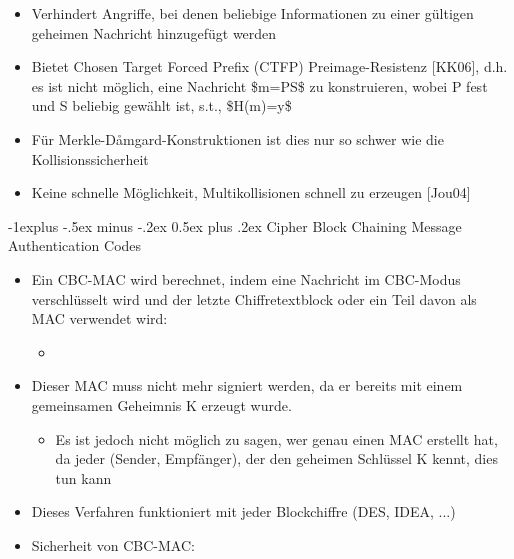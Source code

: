 \documentclass[a4paper]{article}
\makeatletter
\renewcommand{\subsection}{\@startsection{subsection}{2}{0mm}%
 {-1explus -.5ex minus -.2ex}%
 {0.5ex plus .2ex}%
 {\normalfont\normalsize\bfseries}}
\makeatother
\begin{document}
\begin{multicols}{3}
\begin{itemize}
\begin{itemize}
                        \begin{itemize}
                            \item
                                  Verhindert Angriffe, bei denen beliebige Informationen zu einer
                                  gültigen geheimen Nachricht hinzugefügt werden
                            \item
                                  Bietet Chosen Target Forced Prefix (CTFP) Preimage-Resistenz
                                  {[}KK06{]}, d.h. es ist nicht möglich, eine Nachricht
                                  \$m=P\textbar\textbar S\$ zu konstruieren, wobei P fest und S
                                  beliebig gewählt ist, s.t., \$H(m)=y\$
                            \item
                                  Für Merkle-Dåmgard-Konstruktionen ist dies nur so schwer wie die
                                  Kollisionssicherheit
                            \item
                                  Keine schnelle Möglichkeit, Multikollisionen schnell zu erzeugen
                                  {[}Jou04{]}
                        \end{itemize}
              \end{itemize}
    \end{itemize}


    \subsection{Cipher Block Chaining Message Authentication
        Codes}

    \begin{itemize}
        \item
              Ein CBC-MAC wird berechnet, indem eine Nachricht im CBC-Modus
              verschlüsselt wird und der letzte Chiffretextblock oder ein Teil davon
              als MAC verwendet wird:

              \begin{itemize}
                  \item
              \end{itemize}
        \item
              Dieser MAC muss nicht mehr signiert werden, da er bereits mit einem
              gemeinsamen Geheimnis K erzeugt wurde.

              \begin{itemize}
                  \item
                        Es ist jedoch nicht möglich zu sagen, wer genau einen MAC erstellt
                        hat, da jeder (Sender, Empfänger), der den geheimen Schlüssel K
                        kennt, dies tun kann
              \end{itemize}
        \item
              Dieses Verfahren funktioniert mit jeder Blockchiffre (DES, IDEA, ...)
        \item
              Sicherheit von CBC-MAC:


\end{itemize}
\end{multicols}
\end{document}
